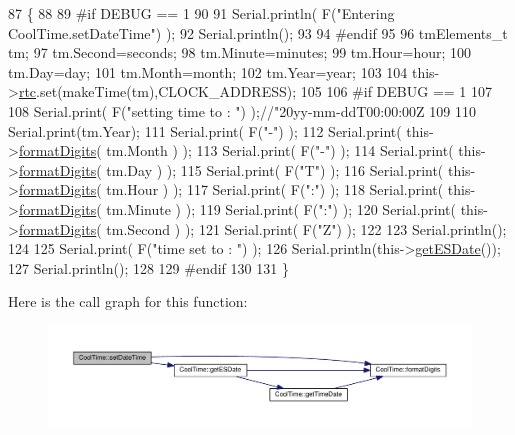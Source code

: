 \begin{DoxyCode}
87 \{ 
88 
89 \textcolor{preprocessor}{#if DEBUG == 1}
90 
91     Serial.println( F(\textcolor{stringliteral}{"Entering CoolTime.setDateTime"}) );
92     Serial.println();
93 
94 \textcolor{preprocessor}{#endif}
95 
96     tmElements\_t tm;
97     tm.Second=seconds; 
98     tm.Minute=minutes; 
99     tm.Hour=hour; 
100     tm.Day=day;
101     tm.Month=month; 
102     tm.Year=year;
103     
104     this->\hyperlink{class_cool_time_abd38f2384ff90692b1568d9db869412e}{rtc}.set(makeTime(tm),CLOCK\_ADDRESS);   
105 
106 \textcolor{preprocessor}{#if DEBUG == 1}
107 
108     Serial.print( F(\textcolor{stringliteral}{"setting time to : "}) );\textcolor{comment}{//"20yy-mm-ddT00:00:00Z}
109 
110     Serial.print(tm.Year);
111     Serial.print( F(\textcolor{stringliteral}{"-"}) );
112     Serial.print( this->\hyperlink{class_cool_time_acd537cd4210d7bde4e1f5c47d2ac0456}{formatDigits}( tm.Month ) );
113     Serial.print( F(\textcolor{stringliteral}{"-"}) );
114     Serial.print( this->\hyperlink{class_cool_time_acd537cd4210d7bde4e1f5c47d2ac0456}{formatDigits}( tm.Day ) );
115     Serial.print( F(\textcolor{stringliteral}{"T"}) );
116     Serial.print( this->\hyperlink{class_cool_time_acd537cd4210d7bde4e1f5c47d2ac0456}{formatDigits}( tm.Hour ) );
117     Serial.print( F(\textcolor{stringliteral}{":"}) );
118     Serial.print( this->\hyperlink{class_cool_time_acd537cd4210d7bde4e1f5c47d2ac0456}{formatDigits}( tm.Minute ) );
119     Serial.print( F(\textcolor{stringliteral}{":"}) );
120     Serial.print( this->\hyperlink{class_cool_time_acd537cd4210d7bde4e1f5c47d2ac0456}{formatDigits}( tm.Second ) );
121     Serial.print( F(\textcolor{stringliteral}{"Z"}) );
122 
123     Serial.println();
124     
125     Serial.print( F(\textcolor{stringliteral}{"time set to : "}) );
126     Serial.println(this->\hyperlink{class_cool_time_ac4f32ee513c1328d984306645e8785a4}{getESDate}());
127     Serial.println();
128 
129 \textcolor{preprocessor}{#endif}
130 
131 \}
\end{DoxyCode}
Here is the call graph for this function\+:\nopagebreak
\begin{figure}[H]
\begin{center}
\leavevmode
\includegraphics[width=350pt]{d6/d49/class_cool_time_ab81ea7fdaace111aa01cc1ec84c6d297_cgraph}
\end{center}
\end{figure}
\mbox{\label{class_cool_time_aae601f795452cfa48d9fb337aed483a8}} 
